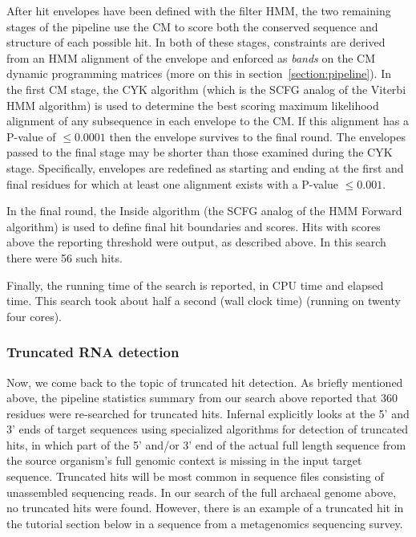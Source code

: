 After hit envelopes have been defined with the filter HMM, the two
remaining stages of the pipeline use the CM to score both the
conserved sequence and structure of each possible hit. In both of
these stages, constraints are derived from an HMM alignment of the
envelope and enforced as \emph{bands} on the CM dynamic programming
matrices (more on this in section~\ref{section:pipeline}). In the
first CM stage, the CYK algorithm (which is the SCFG analog of the
Viterbi HMM algorithm) is used to determine the best scoring maximum
likelihood alignment of any subsequence in each envelope to the CM. If
this alignment has a P-value of $\leq 0.0001$ then the envelope
survives to the final round. The envelopes passed to the final stage
may be shorter than those examined during the CYK stage. Specifically,
envelopes are redefined as starting and ending at the first and final
residues for which at least one alignment exists with a P-value $\leq
0.001$.

In the final round, the Inside algorithm (the SCFG analog of the HMM
Forward algorithm) is used to define final hit boundaries and
scores. Hits with scores above the reporting threshold were output, as
described above. In this search there were 56 such hits.

Finally, the running time of the search is reported, in CPU time and
elapsed time. This search took about half a second (wall
clock time) (running on twenty four cores). 

\subsubsection{Truncated RNA detection}

Now, we come back to the topic of truncated hit detection.  As briefly
mentioned above, the pipeline statistics summary from our search above
reported that 360 residues were re-searched for truncated
hits. Infernal explicitly looks at the 5' and 3' ends of target
sequences using specialized algorithms for detection of truncated
hits, in which part of the 5' and/or 3' end of the actual full length
sequence from the source organism's full genomic context is missing in
the input target sequence. Truncated hits will be most common in
sequence files consisting of unassembled sequencing reads. In our
search of the full archaeal genome above, no truncated hits were
found. However, there is an example of a truncated hit in the
 tutorial section below in a sequence from a metagenomics
sequencing survey.

